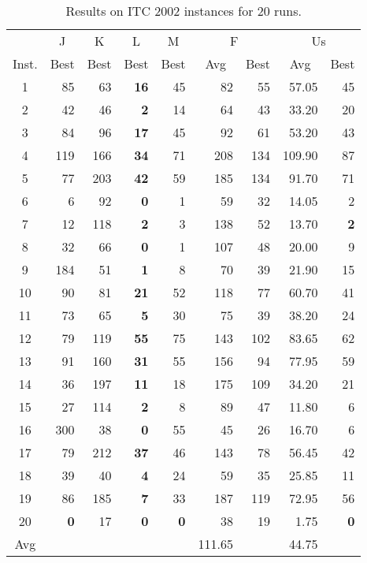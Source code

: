 \documentclass[authoryear,preprint,a4paper,12pt]{elsarticle}
\begin{document}
\begin{table}[t]
 \centering
 \footnotesize
 \begin{tabular}{|c|r|r|r|r|rr|rr|}\hline
 & \multicolumn{1}{c|}{J} & \multicolumn{1}{c|}{K} & \multicolumn{1}{c|}{L} & \multicolumn{1}{c|}{M} & \multicolumn{ 2}{c|}{F} & \multicolumn{ 2}{c|}{Us} \\ 
Inst. & \multicolumn{1}{c|}{Best} & \multicolumn{1}{c|}{Best} & \multicolumn{1}{c|}{Best} & \multicolumn{1}{c|}{Best} & \multicolumn{1}{c}{Avg} & \multicolumn{1}{c|}{Best} & \multicolumn{1}{c}{Avg} & \multicolumn{1}{c|}{Best} \\ 
\hline
1 & 85 & 63 & \textbf{16} & 45 & 82 & 55 & 57.05 & 45 \\ 
2 & 42 & 46 & \textbf{2} & 14 & 64 & 43 & 33.20 & 20 \\ 
3 & 84 & 96 & \textbf{17} & 45 & 92 & 61 & 53.20 & 43 \\ 
4 & 119 & 166 & \textbf{34} & 71 & 208 & 134 & 109.90 & 87 \\ 
5 & 77 & 203 & \textbf{42} & 59 & 185 & 134 & 91.70 & 71 \\ 
6 & 6 & 92 & \textbf{0} & 1 & 59 & 32 & 14.05 & 2 \\ 
7 & 12 & 118 & \textbf{2} & 3 & 138 & 52 & 13.70 & \textbf{2} \\ 
8 & 32 & 66 & \textbf{0} & 1 & 107 & 48 & 20.00 & 9 \\ 
9 & 184 & 51 & \textbf{1} & 8 & 70 & 39 & 21.90 & 15 \\ 
10 & 90 & 81 & \textbf{21} & 52 & 118 & 77 & 60.70 & 41 \\ 
11 & 73 & 65 & \textbf{5} & 30 & 75 & 39 & 38.20 & 24 \\ 
12 & 79 & 119 & \textbf{55} & 75 & 143 & 102 & 83.65 & 62 \\ 
13 & 91 & 160 & \textbf{31} & 55 & 156 & 94 & 77.95 & 59 \\ 
14 & 36 & 197 & \textbf{11} & 18 & 175 & 109 & 34.20 & 21 \\ 
15 & 27 & 114 & \textbf{2} & 8 & 89 & 47 & 11.80 & 6 \\ 
16 & 300 & 38 & \textbf{0} & 55 & 45 & 26 & 16.70 & 6 \\ 
17 & 79 & 212 & \textbf{37} & 46 & 143 & 78 & 56.45 & 42 \\ 
18 & 39 & 40 & \textbf{4} & 24 & 59 & 35 & 25.85 & 11 \\ 
19 & 86 & 185 & \textbf{7} & 33 & 187 & 119 & 72.95 & 56 \\ 
20 & \textbf{0} & 17 & \textbf{0} & \textbf{0} & 38 & 19 & 1.75 & \textbf{0} \\ \hline
Avg &  &  &  &  & 111.65 & & 44.75 &  \\ 
\hline
\end{tabular}

 
  \caption{Results on ITC 2002 instances for 20 runs.}
  \label{tab:ITC2002_results}
\end{table}
\end{document}
